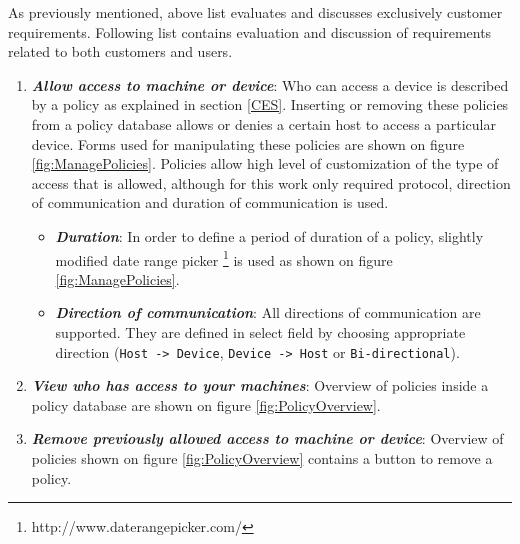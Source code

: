 As previously mentioned, above list evaluates and discusses exclusively customer requirements. Following list contains evaluation and discussion of requirements related to both customers and users. 

\begin{enumerate}
	\setlength{\itemsep}{1pt}
	\item \textbf{\textit{Allow access to machine or device}}: Who can access a device is described by a policy as explained in section \ref{CES}. Inserting or removing these policies from a policy database allows or denies a certain host to access a particular device. Forms used for manipulating these policies are shown on figure \ref{fig:ManagePolicies}. Policies allow high level of customization of the type of access that is allowed, although for this work only required protocol, direction of communication and duration of communication is used.
		\begin{itemize}
			\item \textbf{\textit{Duration}}: In order to define a period of duration of a policy, slightly modified date range picker \footnote{http://www.daterangepicker.com/} is used as shown on figure \ref{fig:ManagePolicies}.

			\item \textbf{\textit{Direction of communication}}: All directions of communication are supported. They are defined in select field by choosing appropriate direction (\verb|Host -> Device|, \verb|Device -> Host| or \verb|Bi-directional|).
		\end{itemize}

	\item \textbf{\textit{View who has access to your machines}}: Overview of policies inside a policy database are shown on figure \ref{fig:PolicyOverview}.

	\item \textbf{\textit{Remove previously allowed access to machine or device}}: Overview of policies shown on figure \ref{fig:PolicyOverview} contains a button to remove a policy.
\end{enumerate}